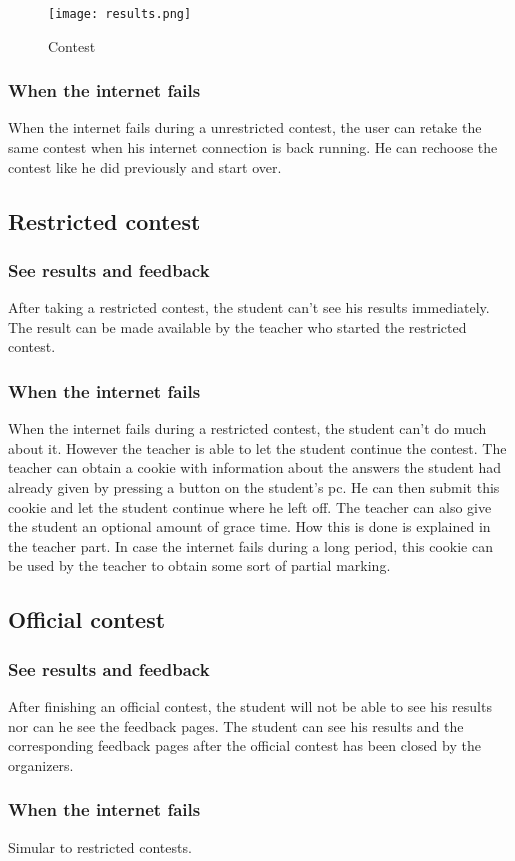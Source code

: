 		\begin{figure}[h]
		  \centering
			\texttt{[image: results.png]}
		  \caption{Contest}
		  \label{Contest}
		\end{figure}

\subsubsection{When the internet fails}
When the internet fails during a unrestricted contest, the user can retake the same contest when his internet connection is back running. He can rechoose the contest like he did previously and start over. 

\subsection{Restricted contest}

\subsubsection{See results and feedback}
After taking a restricted contest, the student can't see his results immediately. The result can be made available by the teacher who started the restricted contest. 

\subsubsection{When the internet fails}
When the internet fails during a restricted contest, the student can't do much about it. However the teacher is able to let the student continue the contest. The teacher can obtain a cookie with information about the answers the student had already given by pressing a button on the student's pc. He can then submit this cookie and let the student continue where he left off. The teacher can also give the student an optional amount of grace time. How this is done is explained in the teacher part. In case the internet fails during a long period, this cookie can be used by the teacher to obtain some sort of partial marking. 

\subsection{Official contest}

\subsubsection{See results and feedback}
After finishing an official contest, the student will not be able to see his results nor can he see the feedback pages. The student can see his results and the corresponding feedback pages after the official contest has been closed by the organizers. 

\subsubsection{When the internet fails}
Simular to restricted contests. 


